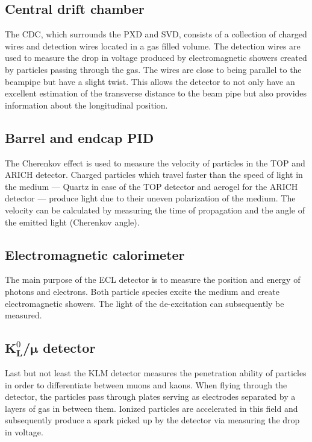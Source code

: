 \subsection{Central drift chamber}
\label{subsec:detector_system_tracking_detectors}

The CDC, which surrounds the PXD and SVD, consists of a collection of charged wires and detection wires located in a gas filled volume. The detection wires are used to measure the drop in voltage produced by electromagnetic showers created by particles passing through the gas. The wires are close to being parallel to the beampipe but have a slight twist. This allows the detector to not only have an excellent estimation of the transverse distance to the beam pipe but also provides information about the longitudinal position.

\subsection{Barrel and endcap PID}
\label{subsec:detector_system_barrel_and_endcap_pid}

The Cherenkov effect is used to measure the velocity of particles in the TOP and ARICH detector. Charged particles which travel faster than the speed of light in the medium --- Quartz in case of the TOP detector and aerogel for the ARICH detector --- produce light due to their uneven polarization of the medium. The velocity can be calculated by measuring the time of propagation and the angle of the emitted light (Cherenkov angle).

\subsection{Electromagnetic calorimeter}
\label{subsec:detector_system_electromagnetic_calorimeter}

The main purpose of the ECL detector is to measure the position and energy of photons and electrons. Both particle species excite the medium and create electromagnetic showers. The light of the de-excitation can subsequently be measured.

\subsection{$\boldsymbol{K}^0_{\boldsymbol{L}}$/$\boldsymbol{\mu}$ detector}
\label{subsec:detector_system_k0lmu}

Last but not least the KLM detector measures the penetration ability of particles in order to differentiate between muons and kaons. When flying through the detector, the particles pass through plates serving as electrodes separated by a layers of gas in between them. Ionized particles are accelerated in this field and subsequently produce a spark picked up by the detector via measuring the drop in voltage.

